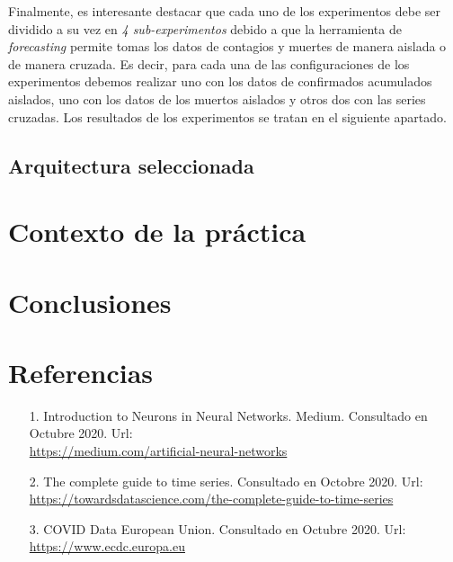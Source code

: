 \documentclass[12pt,a4paper, xcolor=table]{article}
\begin{document}
    Finalmente, es interesante destacar que cada uno de los experimentos debe ser dividido a su vez en\textit{ 4 sub-experimentos} debido a que la herramienta de \textit{forecasting} permite tomas los datos de contagios y muertes de manera aislada o de manera cruzada. Es decir, para cada una de las configuraciones de los experimentos debemos realizar uno con los datos de confirmados acumulados aislados, uno con los datos de los muertos aislados y otros dos con las series cruzadas. Los resultados de los experimentos se tratan en el siguiente apartado.
        
    \subsection{Arquitectura seleccionada}

\section{Contexto de la práctica}


 \section{Conclusiones}

\clearpage 

\section{Referencias}
    \begin{itemize}
        \item [1.] Introduction to Neurons in Neural Networks. Medium. Consultado en Octubre 2020. Url: \\
        \href{https://medium.com/artificial-neural-networks/introduction-to-neurons-in-neural-networks-71828d040a65}{https://medium.com/artificial-neural-networks}
        \item [2.] The complete guide to time series. Consultado en Octobre 2020. Url: \\
        \href{https://towardsdatascience.com/the-complete-guide-to-time-series-analysis-and-forecasting-70d476bfe775}{https://towardsdatascience.com/the-complete-guide-to-time-series}
        \item [3.] COVID Data European Union. Consultado en Octubre 2020. Url: \\
        \href{https://www.ecdc.europa.eu/en/geographical-distribution-2019-ncov-cases}{https://www.ecdc.europa.eu}    
    \end{itemize}
\printindex
\end{document}
